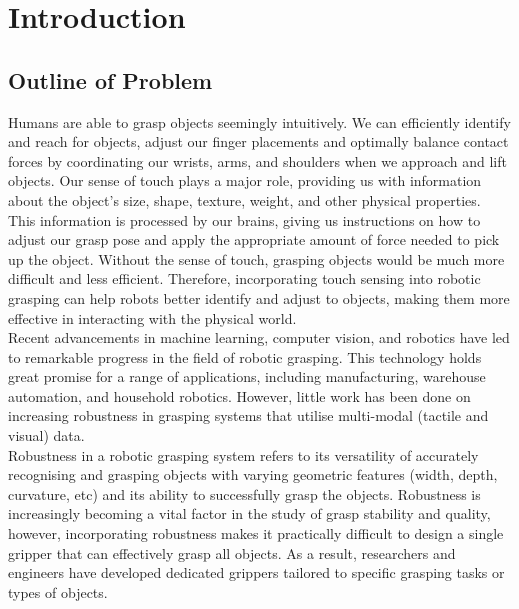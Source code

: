 \documentclass[11pt, a4paper]{report}
\begin{document}
\tableofcontents


\chapter{Introduction}
\label{chap:1}
\setcounter{page}{1}


\section{Outline of Problem}
\label{sec:1.1}
Humans are able to grasp objects seemingly intuitively. We can efficiently identify and reach for objects, adjust our finger placements and optimally balance contact forces by coordinating our wrists, arms, and shoulders when we approach and lift objects. Our sense of touch plays a major role, providing us with information about the object's size, shape, texture, weight, and other physical properties. This information is processed by our brains, giving us instructions on how to adjust our grasp pose and apply the appropriate amount of force needed to pick up the object. Without the sense of touch, grasping objects would be much more difficult and less efficient. Therefore, incorporating touch sensing into robotic grasping can help robots better identify and adjust to objects, making them more effective in interacting with the physical world.\\

Recent advancements in machine learning, computer vision, and robotics have led to remarkable progress in the field of robotic grasping. This technology holds great promise for a range of applications, including manufacturing, warehouse automation, and household robotics. However, little work has been done on increasing robustness in grasping systems that utilise multi-modal (tactile and visual) data.\\

Robustness in a robotic grasping system refers to its versatility of accurately recognising and grasping objects with varying geometric features (width, depth, curvature, etc) and its ability to successfully grasp the objects. Robustness is increasingly becoming a vital factor in the study of grasp stability and quality, however, incorporating robustness makes it practically difficult to design a single gripper that can effectively grasp all objects. As a result, researchers and engineers have developed dedicated grippers tailored to specific grasping tasks or types of objects.\\
\end{document}
